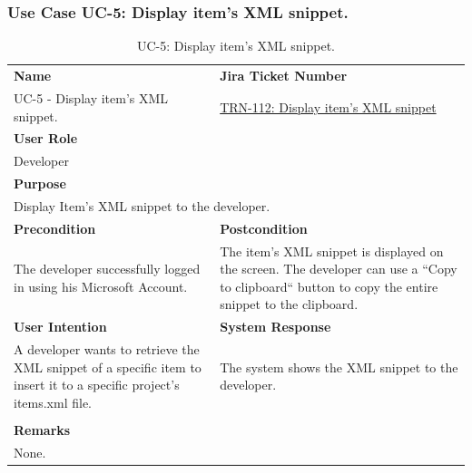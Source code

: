 \subsubsection{Use Case UC-5: Display item's XML snippet.}\label{subsubsec:use-case-uc-5:-display-item's-xml-snippet}

\begin{table}[H]
    \centering
    \begin{tabular}{|p{}|p{}|}

        \hline
        \rowcolor{gray!50}\textbf{Name} & \rowcolor{gray!50}\textbf{Jira Ticket Number} \\
        UC-5 - Display item's XML snippet.
        &
        \href{https://fh-burgenland.atlassian.net/browse/TRN-112}{TRN-112: Display item's XML snippet} \\ \hline


        \multicolumn{2}{|l|}{\rowcolor{gray!50}\textbf{User Role}} \\
        \multicolumn{2}{|l|}{Developer} \\ \hline

        \multicolumn{2}{|l|}{\rowcolor{gray!50}\textbf{Purpose}} \\
        \multicolumn{2}{|l|}{Display Item's XML snippet to the developer.} \\ \hline

        \rowcolor{gray!50}\textbf{Precondition} & \rowcolor{gray!50}\textbf{Postcondition} \\
        The developer successfully logged in using his Microsoft Account.
        &
        The item's XML snippet is displayed on the screen.
        The developer can use a ``Copy to clipboard`` button to copy the entire snippet to the clipboard.\\ \hline

        \rowcolor{gray!50}\textbf{User Intention} & \rowcolor{gray!50}\textbf{System Response} \\
        A developer wants to retrieve the XML snippet of a specific item to insert it to a specific project's items.xml file.
        &
        The system shows the XML snippet to the developer. \\ \hline

        & \\ \hline

        \multicolumn{2}{|l|}{\rowcolor{gray!50}\textbf{Remarks}} \\
        \multicolumn{2}{|p{1\textwidth}|}{None.} \\ \hline
    \end{tabular}
    \caption{UC-5: Display item's XML snippet.}
    \label{tab:uc-xml-snippet}
\end{table}

